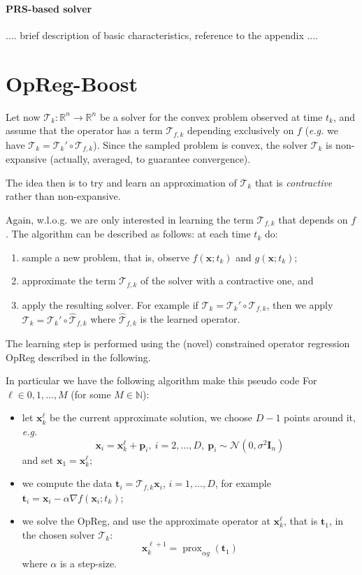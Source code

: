 \documentclass{article}
\DeclareMathOperator{\prox}{prox}
\newcommand{\N}{\mathbb{N}}
\newcommand{\R}{\mathbb{R}}
\newcommand{\p}{\mathbold{p}}
\newcommand{\tv}{\mathbold{t}}
\newcommand{\x}{\mathbold{x}}
\renewcommand{\Im}{\mathbold{I}}
\newcommand{\T}{\mathcal{T}}
\newcommand{\nicola}[1]{{\color{blue}#1}}
\begin{document}
\paragraph{PRS-based solver}
.... brief description of basic characteristics, reference to the appendix ....


\section{OpReg-Boost}\label{sec:online-opreg}

Let now $\T_k : \R^n \to \R^n$ be a solver for the convex problem observed at time $t_k$, and assume that the operator has a term $\T_{f,k}$ depending exclusively on $f$ (\emph{e.g.} we have $\T_k = \T_k' \circ \T_{f,k}$). Since the sampled problem is convex, the solver $\T_k$ is non-expansive (actually, averaged, to guarantee convergence).

The idea then is to try and learn an approximation of $\T_k$ that is \emph{contractive} rather than non-expansive.

Again, w.l.o.g. we are only interested in learning the term $\T_{f,k}$ that depends on $f$. The algorithm can be described as follows: at each time $t_k$ do:
\begin{enumerate}
	\item sample a new problem, that is, observe $f(\x; t_k)$ and $g(\x; t_k)$;

	\item approximate the term $\T_{f,k}$ of the solver with a contractive one, and
	
	\item apply the resulting solver. For example if $\T_k = \T_k' \circ \T_{f,k}$, then we apply $\T_k = \T_k' \circ \hat{\T}_{f,k}$ where $\hat{\T}_{f,k}$ is the learned operator.
\end{enumerate}
The learning step is performed using the (novel) constrained operator regression OpReg described in the following.

In particular we have the following algorithm \nicola{make this pseudo code}
For $\ell \in 0, 1, \ldots, M$ (for some $M \in \N$):
\begin{itemize}
	\item let $\x_k^\ell$ be the current approximate solution, we choose $D-1$ points around it, \emph{e.g.}
	$$
		\x_i = \x_k^\ell + \p_i, \ i = 2, \ldots, D, \ \p_i \sim \mathcal{N}(0, \sigma^2 \Im_n)
	$$
	and set $\x_1 = \x_k^\ell$;
	
	\item we compute the data $\tv_i = \T_{f,k} \x_i$, $i = 1, \ldots, D$, for example $\tv_i = \x_i - \alpha \nabla f(\x_i; t_k)$;
	
	\item we solve the OpReg, and use the approximate operator at $\x_k^\ell$, that is $\tv_1$, in the chosen solver $\T_k$:
	$$
		\x_k^{\ell+1} = \prox_{\alpha g}(\tv_1)
	$$
	where $\alpha$ is a step-size.
\end{itemize}
\end{document}
